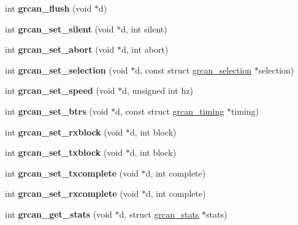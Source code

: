 \begin{DoxyCompactItemize}
int {\bfseries grcan\+\_\+flush} (void $\ast$d)
\item 
\mbox{\label{group__can_ga9d51e5bd512df3ad5e9c443fd6e7c7ca}} 
int {\bfseries grcan\+\_\+set\+\_\+silent} (void $\ast$d, int silent)
\item 
\mbox{\label{group__can_gabd530f634862ee29eef0e63033c1c058}} 
int {\bfseries grcan\+\_\+set\+\_\+abort} (void $\ast$d, int abort)
\item 
\mbox{\label{group__can_ga28a4144a7a1b7659307ada72ab674771}} 
int {\bfseries grcan\+\_\+set\+\_\+selection} (void $\ast$d, const struct \mbox{\hyperlink{structgrcan__selection}{grcan\+\_\+selection}} $\ast$selection)
\item 
\mbox{\label{group__can_ga808488fad3c85e1106a528b788d9b91a}} 
int {\bfseries grcan\+\_\+set\+\_\+speed} (void $\ast$d, unsigned int hz)
\item 
\mbox{\label{group__can_gac9542278f494f01d177e0ace5108eabb}} 
int {\bfseries grcan\+\_\+set\+\_\+btrs} (void $\ast$d, const struct \mbox{\hyperlink{structgrcan__timing}{grcan\+\_\+timing}} $\ast$timing)
\item 
\mbox{\label{group__can_ga6aee02fa7e6c017ff0c86b151855900b}} 
int {\bfseries grcan\+\_\+set\+\_\+rxblock} (void $\ast$d, int block)
\item 
\mbox{\label{group__can_gab6504328ac709a8f6c672ff406ce2c6a}} 
int {\bfseries grcan\+\_\+set\+\_\+txblock} (void $\ast$d, int block)
\item 
\mbox{\label{group__can_ga927e99f105e0b47eaa594c3d04d4ed26}} 
int {\bfseries grcan\+\_\+set\+\_\+txcomplete} (void $\ast$d, int complete)
\item 
\mbox{\label{group__can_gaac643597f74600f03d1157e3544c073a}} 
int {\bfseries grcan\+\_\+set\+\_\+rxcomplete} (void $\ast$d, int complete)
\item 
\mbox{\label{group__can_gaad82f38f5f20f639dfa4afebe01d0501}} 
int {\bfseries grcan\+\_\+get\+\_\+stats} (void $\ast$d, struct \mbox{\hyperlink{structgrcan__stats}{grcan\+\_\+stats}} $\ast$stats)

\end{DoxyCompactItemize}
